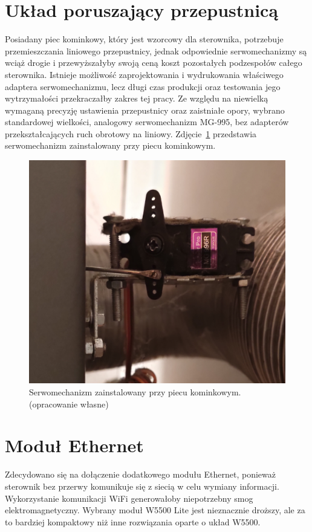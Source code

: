 \documentclass[11pt]{report}
\begin{document}
 \section{Układ poruszający przepustnicą} 
 Posiadany piec kominkowy, który jest wzorcowy dla sterownika, potrzebuje przemieszczania liniowego przepustnicy, jednak odpowiednie serwomechanizmy są wciąż drogie i przewyższałyby swoją ceną koszt pozostałych podzespołów całego sterownika.
 Istnieje możliwość zaprojektowania i wydrukowania właściwego adaptera serwomechanizmu, lecz długi czas produkcji oraz testowania jego wytrzymałości przekraczałby zakres tej pracy.
  Ze względu na niewielką wymaganą precyzję ustawienia przepustnicy oraz zaistniałe opory, wybrano standardowej wielkości, analogowy serwomechanizm MG-995, bez adapterów przekształcających ruch obrotowy na liniowy.
   Zdjęcie~\ref{fig:servo} przedstawia serwomechanizm zainstalowany przy piecu kominkowym.
    \begin{figure}[ht]
\centering
\includegraphics[width=0.8 \textwidth]{fig/servo.jpg}
\caption{Serwomechanizm zainstalowany przy piecu kominkowym. (opracowanie własne)}
\label{fig:servo}
\end{figure}
 
 \section{Moduł Ethernet}
 Zdecydowano się na dołączenie dodatkowego modułu Ethernet, ponieważ sterownik bez przerwy komunikuje się z siecią w celu wymiany informacji. Wykorzystanie komunikacji WiFi generowałoby niepotrzebny smog elektromagnetyczny. Wybrany moduł W5500 Lite jest nieznacznie droższy, ale za to bardziej kompaktowy niż inne rozwiązania oparte o układ W5500.
 
\end{document}
